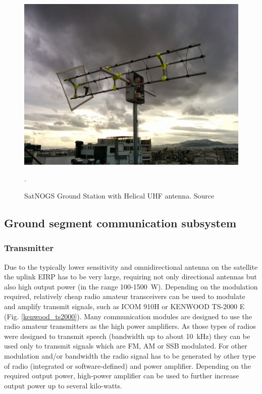\begin{figure}[H]
    \centering
    \includegraphics[width=0.45\paperwidth]{img/4/satnogs_gs.jpg}
    \caption{SatNOGS Ground Station with Helical UHF antenna. Source \cite{satnogs}}.
    \label{gs:satnogs}
\end{figure}

\subsection{Ground segment communication subsystem}
\subsubsection{Transmitter}
Due to the typically lower sensitivity and omnidirectional antenna on the satellite the uplink EIRP has to be very large, requiring not only directional antennas but also high output power (in the range \si{100}-\SI{1500}{\watt}).
Depending on the modulation required, relatively cheap radio amateur transceivers can be used to modulate and amplify transmit signals, such as ICOM 910H or KENWOOD TS-2000 E (Fig. \ref{kenwood_ts2000}). Many communication modules are designed to use the radio amateur transmitters as the high power amplifiers. As those types of radios were designed to transmit speech (bandwidth up to about \SI{10}{\kHz}) they can be used only to transmit signals which are FM, AM or SSB modulated. For other modulation and/or bandwidth the radio signal has to be generated by other type of radio (integrated or software-defined) and power amplifier. Depending on the required output power, high-power amplifier can be used to further increase output power up to several kilo-watts. 

